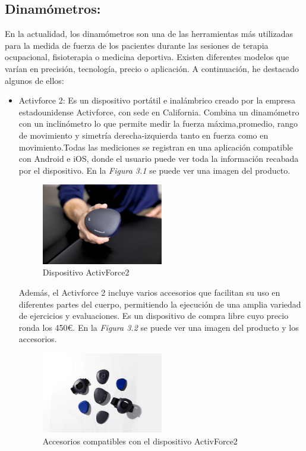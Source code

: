 \subsection{Dinamómetros:}
En la actualidad, los dinamómetros son una de las herramientas más utilizadas  para la medida de fuerza de los pacientes durante las sesiones de terapia ocupacional, fisioterapia o medicina deportiva. Existen diferentes modelos que varían en precisión, tecnología, precio o aplicación. 
A continuación, he destacado algunos de ellos:
\begin{itemize}
    \item Activforce 2: Es un dispositivo portátil e inalámbrico creado por la empresa estadounidense Activforce, con sede en California. Combina un dinamómetro con un inclinómetro lo que permite medir la fuerza máxima,promedio, rango de movimiento y simetría derecha-izquierda tanto en fuerza como en movimiento.Todas las mediciones se registran en una aplicación compatible con Android e iOS, donde el usuario puede ver toda la información recabada por el dispositivo. En la \textit{Figura 3.1} se puede ver una imagen del producto.
    \begin{figure}[h]
        \centering
        \includegraphics[width=0.5\textwidth]{img/ActivForce_Device.jpg}
        \caption{Dispositivo ActivForce2}
        \label{fig:activforce}
    \end{figure}
    
    Además, el Activforce 2 incluye varios accesorios que facilitan su uso en diferentes partes del cuerpo, permitiendo la ejecución de una amplia variedad de ejercicios y evaluaciones. Es un dispositivo de compra libre cuyo precio ronda los 450€. En la \textit{Figura 3.2} se puede ver una imagen del producto y los accesorios.
    \begin{figure}[h]
        \centering
        \includegraphics[width=0.5\textwidth]{img/ActivForce_Attachments.jpg}
        \caption{Accesorios compatibles con el dispositivo ActivForce2}
        \label{fig:activforce}
    \end{figure}


\end{itemize}
